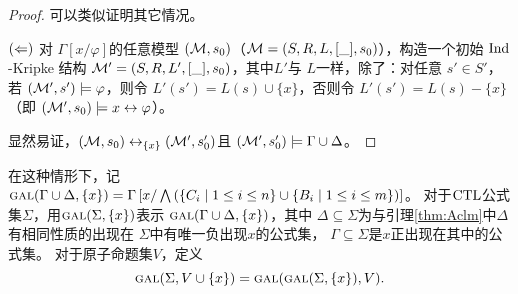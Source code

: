 \begin{proof}
	可以类似证明其它情况。
	
	
	$(\Leftarrow)$ 对 $\Gamma\left[x/\varphi \right]$的任意模型 $({\cal M}, s_0)$（${\cal M} = (S, R, L,[\_], s_0)$），构造一个初始 $\textrm{Ind}$-Kripke 结构 ${\cal M}'=(S, R, L',[\_], s_0)$，其中$L'$与 $L$一样，除了：对任意 $s'\in S'$，若 $({\cal M}', s') \models \varphi$，则令 $L'(s') = L(s) \cup \{x\}$，否则令 $L'(s') = L(s)-\{x\}$（即 $({\cal M}', s_0) \models x \leftrightarrow \varphi$）。
	
	显然易证，$({\cal M},s_0) \leftrightarrow_{\{x\}} ({\cal M}', s_0')$且 $({\cal M}',s_0') \models \Gamma \cup \Delta$。
\end{proof}


在这种情形下，记 $\textsc{gal}(\Gamma\cup\Delta,\{x\})=\Gamma\left[x/\bigwedge\left(\{C_i\mid 1\le i\le n\}\cup\{B_i\mid 1\le i\le m\}\right)\right]$。
%
对于$\textrm{CTL}$公式集$\Sigma$，用$\textsc{gal}(\Sigma,\{x\})$表示 $\textsc{gal}(\Gamma\cup\Delta,\{x\})$，其中 $\Delta\subseteq\Sigma$为与引理\ref{thm:Aclm}中$\Delta$有相同性质的出现在 $\Sigma$中有唯一负出现$x$的公式集， $\Gamma\subseteq \Sigma$是$x$正出现在其中的公式集。
对于原子命题集$V$，定义
$$\textsc{gal}(\Sigma,V\cup\{x\})=\textsc{gal}(\textsc{gal}(\Sigma,\{x\}),V).$$

